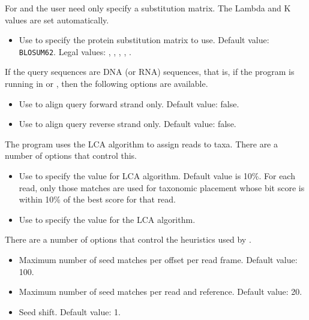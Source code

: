 \documentclass[11pt]{article}
\begin{document}
For  and  the user need only specify a substitution matrix. The Lambda and
K values are set automatically.
\begin{itemize}
\setlength{\itemindent}{30pt}
\item[\itt{--subMatrix}] Use to specify the protein substitution matrix to use. Default value: {\tt BLOSUM62}. Legal values: 
, , , , .
\end{itemize}

If the query sequences are DNA (or RNA) sequences, that is, if the program is running in  {}
or  , then the following options are available.
\begin{itemize}
\setlength{\itemindent}{30pt}
\item[\itt{--forwardOnly}]       Use to align query forward strand only. Default value: false.
\item[\itt{ --reverseOnly}]       Use to align query reverse strand only. Default value: false.
\end{itemize}

The program uses the LCA algorithm \cite{MEGAN2007} to assign reads to taxa. There are a number of
options that control this.
\begin{itemize}
\setlength{\itemindent}{30pt}
\item[\itt{--topPercent}]          Use to specify the  value for LCA algorithm. Default value is 10\%. For each read,
only those matches are used for taxonomic placement whose bit score is within 10\% of the best score for that read.
\item[\itt{--minSupport}]           Use to specify the  value for the LCA algorithm. 
\end{itemize}

There are a number of options that control the heuristics used by .
\begin{itemize}
\setlength{\itemindent}{30pt}
\item[{\itt{--maxSeedsPerFrame}}]   Maximum number of seed matches per offset per read frame. Default value: 100.
\item[{\itt{--maxSeedsPerRef}}]      Maximum number of seed matches per read and reference. Default value: 20.
\item[\itt{ --seedShift}]            Seed shift. Default value: 1.
\end{itemize}
\end{document}
